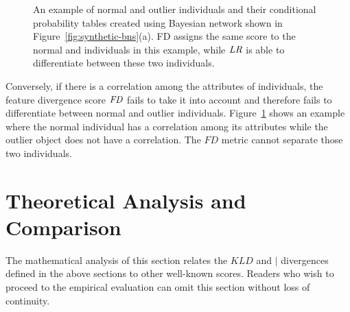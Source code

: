 {%

\begin{figure*}[htbp]
	\centering
	\caption{An example of normal and outlier individuals and  their conditional probability tables  created using Bayesian network shown in Figure~\ref{fig:synthetic-bns}(a). FD assigns the same score to the normal and individuals in this example, while $\it{LR}$ is able to differentiate between these two individuals.
		\label{fig:fdfails}}
\end{figure*}
Conversely, if there is a correlation among the attributes of individuals, the feature divergence score $\it{FD}$ fails to take it into account and therefore fails to differentiate between normal and outlier individuals. Figure~\ref{fig:fdfails} shows an example where the normal individual has a correlation among its attributes while the outlier object does not have a correlation. The $\textit{FD}$ metric cannot separate  those two individuals.

\section{Theoretical Analysis and Comparison} \label{sec:theory}
The mathematical analysis of this section relates the $KLD$ and $\mid$ divergences defined in the above sections to other well-known scores. Readers who wish to proceed to the empirical evaluation can omit this section without loss of continuity. 

}
